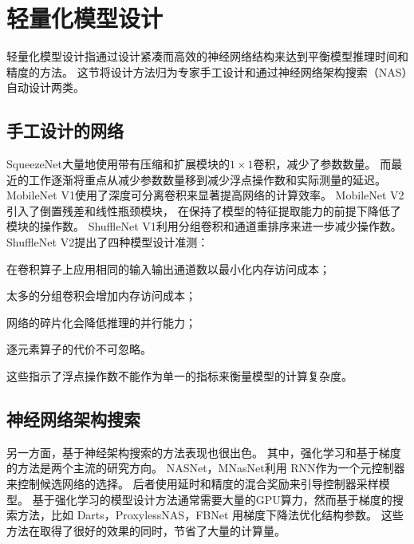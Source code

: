 \section{轻量化模型设计}
轻量化模型设计指通过设计紧凑而高效的神经网络结构来达到平衡模型推理时间和精度的方法。
这节将设计方法归为专家手工设计和通过神经网络架构搜索（NAS）自动设计两类。

\subsection{手工设计的网络}
SqueezeNet\cite{iandola2016squeezenet}大量地使用带有压缩和扩展模块的$1\times 1$卷积，减少了参数数量。
而最近的工作逐渐将重点从减少参数数量移到减少浮点操作数和实际测量的延迟。
MobileNet V1\cite{howard2017mobilenets}使用了深度可分离卷积来显著提高网络的计算效率。
MobileNet V2\cite{sandler2018mobilenetv2}引入了倒置残差和线性瓶颈模块，
在保持了模型的特征提取能力的前提下降低了模块的操作数。
ShuffleNet V1\cite{zhang2018shufflenet}利用分组卷积和通道重排序来进一步减少操作数。
ShuffleNet V2\cite{ma2018shufflenet}提出了四种模型设计准测：
\begin{enumerate*}
    \item 在卷积算子上应用相同的输入输出通道数以最小化内存访问成本；
    \item 太多的分组卷积会增加内存访问成本；
    \item 网络的碎片化会降低推理的并行能力；
    \item 逐元素算子的代价不可忽略。
\end{enumerate*}
这些指示了浮点操作数不能作为单一的指标来衡量模型的计算复杂度。

\subsection{神经网络架构搜索}
另一方面，基于神经架构搜索的方法表现也很出色。
其中，强化学习和基于梯度的方法是两个主流的研究方向。
NASNet\cite{zoph2018learning}，MNasNet\cite{tan2019mnasnet}利用
RNN作为一个元控制器来控制候选网络的选择。
后者使用延时和精度的混合奖励来引导控制器采样模型。
基于强化学习的模型设计方法通常需要大量的GPU算力，然而基于梯度的搜索方法，比如
Darts\cite{liu2018darts}，ProxylessNAS\cite{cai2018proxylessnas}，FBNet\cite{wu2019fbnet}
用梯度下降法优化结构参数。
这些方法在取得了很好的效果的同时，节省了大量的计算量。